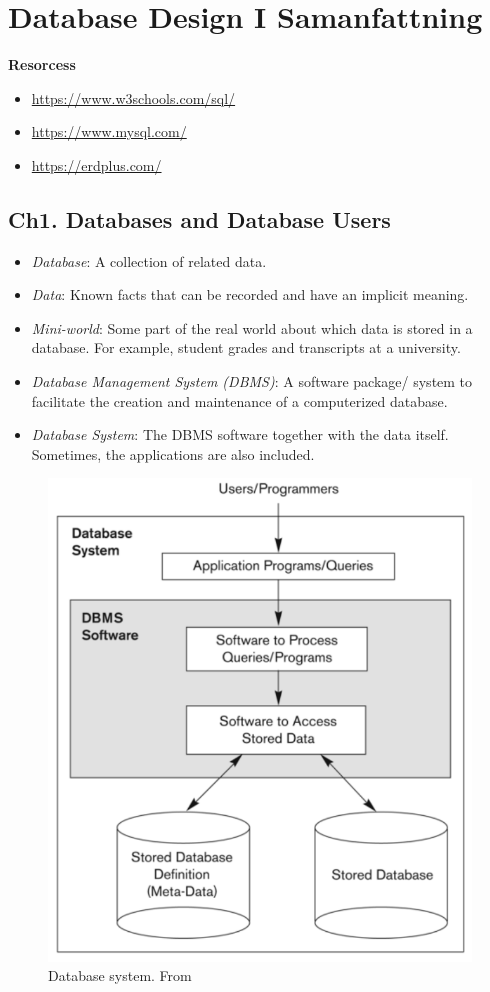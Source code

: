 \chapter{Database Design I Samanfattning}

\textbf{Resorcess}
\begin{itemize}
    \item \url{https://www.w3schools.com/sql/}
    \item \url{https://www.mysql.com/}
    \item \url{https://erdplus.com/}
\end{itemize}


\newpage
\section{Ch1. Databases and Database Users}
\begin{itemize}
    \item \textit{Database}: A collection of related data.
    \item \textit{Data}: Known facts that can be recorded and have an implicit meaning.
    \item \textit{Mini-world}: Some part of the real world about which data is stored 
    in a database. For example, student grades and transcripts at a university.
    \item \textit{Database Management System (DBMS)}: A software package/ system to 
    facilitate the creation and maintenance of a computerized database.
    \item \textit{Database System}: The DBMS software together with the data itself. 
    Sometimes, the applications are also included.
\end{itemize}

\begin{figure}[!h]
    \centering
    \includegraphics[width=12cm]{image/database-system.pdf}
    \caption{Database system. From \cite{}}
\end{figure}

